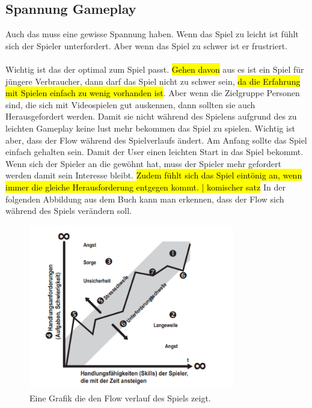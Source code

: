 \subsection{Spannung Gameplay}
Auch das  muss eine gewisse Spannung haben. Wenn das Spiel zu leicht ist fühlt sich der Spieler unterfordert. Aber wenn das Spiel zu schwer ist er frustriert.\\\\
Wichtig ist das der  optimal zum Spiel passt. \hl{Gehen davon} aus es ist ein Spiel für jüngere Verbraucher, dann darf das Spiel nicht zu schwer sein, \hl{da die Erfahrung mit Spielen einfach zu wenig vorhanden ist}. Aber wenn die Zielgruppe Personen sind, die sich mit Videospielen gut auskennen, dann sollten sie auch Herausgefordert werden. Damit sie nicht während des Spielens aufgrund des zu leichten Gameplay keine lust mehr bekommen das Spiel zu spielen. Wichtig ist aber, dass der Flow während des Spielverlaufs ändert. Am Anfang sollte das Spiel einfach gehalten sein. Damit der User einen leichten Start in das Spiel bekommt. Wenn sich der Spieler an die  gewöhnt hat, muss der Spieler mehr gefordert werden damit sein Interesse bleibt. \hl{Zudem fühlt sich das Spiel eintönig an, wenn immer die gleiche Herausforderung entgegen kommt. | komischer satz} In der folgenden Abbildung aus dem Buch  kann man erkennen, dass der Flow sich während des Spiels verändern soll.


\begin{figure}[H]
    \centering
    \includegraphics[width=0.8\textwidth]{chapters/15/images/GameFlow.png}
    \caption{Eine Grafik die den Flow verlauf des Spiels zeigt.}
    \label{UST-4}
\end{figure}


